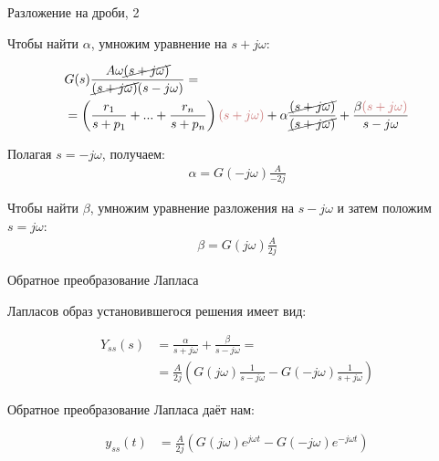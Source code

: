 \documentclass{beamer}
\begin{document}
\begin{frame}{Разложение на дроби, 2}
	\begin{flushleft}
		
		Чтобы найти $\alpha$, умножим уравнение на $s + j\omega$:
		
		\begin{align*}
			&G(s)\frac{A \omega \cancel{(s + j\omega)}}{ \cancel{(s + j\omega)}(s - j\omega)} 
			= \\
			&=
			\left( \frac{r_1}{s + p_1} + ... + \frac{r_n}{s + p_n} \right) 
			\textcolor{myred}{(s + j\omega) }
			+ 
			\alpha \frac{\cancel{(s + j\omega)}}{ \cancel{(s + j\omega)}}  + \frac{\beta \textcolor{myred}{(s + j\omega) }}{s - j\omega}
		\end{align*}		
		
		Полагая $s = -j\omega$, получаем:
		\begin{align}
			\alpha = G(-j\omega)\frac{A }{-2j} 
		\end{align}
		
		Чтобы найти $\beta$, умножим уравнение разложения на $s - j\omega$ и затем положим $s = j\omega$:
		\begin{align}
			\beta = G(j\omega)\frac{A}{2j} 
		\end{align}
		
	\end{flushleft}
\end{frame}


\begin{frame}{Обратное преобразование Лапласа}
	\begin{flushleft}
		
		Лапласов образ установившегося решения имеет вид:
		
		\begin{align}
			Y_{ss}(s) &= \frac{\alpha}{s + j\omega} + \frac{\beta}{s - j\omega} =
			\\
			&=
			\frac{A}{2j}
			\left(
			G(j\omega)\frac{1}{s - j\omega} -G(-j\omega) \frac{1}{s + j\omega}
			\right)
		\end{align}
		
		Обратное преобразование Лапласа даёт нам:
		
		\begin{align}
			y_{ss}(t) &= 
			\frac{A}{2j}
			\left(
			G(j\omega)e^{ j\omega t} - G(-j\omega) e^{- j\omega t}
			\right)
		\end{align}
		
	\end{flushleft}
\end{frame}
\end{document}
